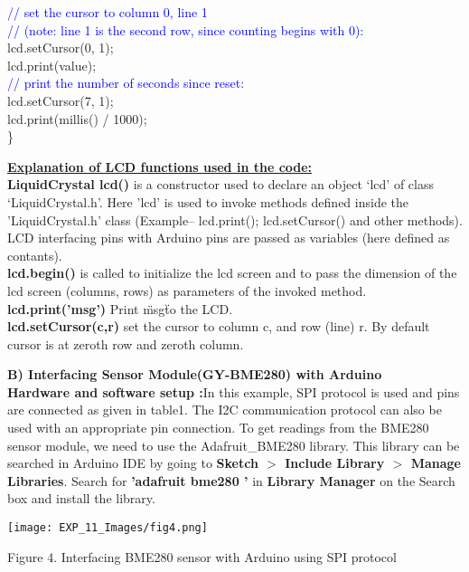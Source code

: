 \documentclass[12pt,a4paper]{article}
\begin{document}
  \textcolor{blue}{// set the cursor to column 0, line 1}\\
  \textcolor{blue}{// (note: line 1 is the second row, since counting begins with 0):}\\
  lcd.setCursor(0, 1);\\
  lcd.print(value);\\
 \textcolor{blue}{// print the number of seconds since reset:}\\
  lcd.setCursor(7, 1);\\
  lcd.print(millis() / 1000);\\

\}

\setlength{\parindent}{0pt}

\begin{justify} \noindent \underline {\textbf{Explanation of LCD functions used in the code:}}\\[9pt]
\noindent \textbf{LiquidCrystal lcd() } is  a constructor used to declare an object ‘lcd’ of class  ‘LiquidCrystal.h’. Here 'lcd' is used to invoke methods defined inside the 'LiquidCrystal.h' class (Example– lcd.print(); lcd.setCursor() and other methods). LCD interfacing pins  with Arduino pins are passed as variables (here defined as contants).\\
\textbf{lcd.begin()}\– is called to initialize the lcd screen and to pass the dimension of the lcd screen (columns, rows) as parameters of the invoked method.\\
\textbf{lcd.print('msg')}\- Print \"msg\" to the LCD.\\
\textbf{lcd.setCursor(c,r)}\- set the cursor to column \‘c\’, and row (line) \‘r\’. By default cursor is at zeroth row and zeroth column.


\noindent \textbf{B) Interfacing Sensor Module(GY-BME280) with Arduino}\\[3pt]
\textbf{Hardware and software setup :}In this example, SPI protocol is used and pins are connected as given in table1. The I2C communication protocol can also be used with an appropriate pin connection. To get readings from the BME280 sensor module, we need to use the Adafruit\_BME280 library. This library can be searched in Arduino IDE by going to \textbf{Sketch $>$ Include Library $>$ Manage Libraries}. Search for \textbf{'adafruit bme280 '} in \textbf{Library Manager} on the Search box and install the library.\end{justify}


\begin{center} 
\texttt{[image: EXP\_11\_Images/fig4.png]}
\end{center}
\begin{center} {Figure 4. Interfacing BME280 sensor with Arduino using SPI protocol}\end{center}
\end{document}
